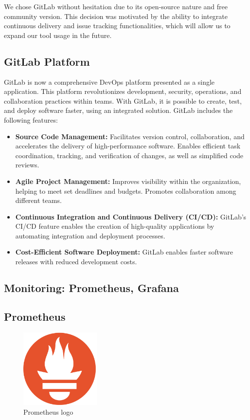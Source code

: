 We chose GitLab without hesitation due to its open-source nature and free community version. This decision was motivated by the ability to integrate continuous delivery and issue tracking functionalities, which will allow us to expand our tool usage in the future.

\subsection*{GitLab Platform}

GitLab is now a comprehensive DevOps platform presented as a single application. This platform revolutionizes development, security, operations, and collaboration practices within teams. With GitLab, it is possible to create, test, and deploy software faster, using an integrated solution. GitLab includes the following features:
\begin{itemize}
    \item \textbf{Source Code Management:} Facilitates version control, collaboration, and accelerates the delivery of high-performance software. Enables efficient task coordination, tracking, and verification of changes, as well as simplified code reviews.
    \item \textbf{Agile Project Management:} Improves visibility within the organization, helping to meet set deadlines and budgets. Promotes collaboration among different teams.
    \item \textbf{Continuous Integration and Continuous Delivery (CI/CD):} GitLab's CI/CD feature enables the creation of high-quality applications by automating integration and deployment processes.
    \item \textbf{Cost-Efficient Software Deployment:} GitLab enables faster software releases with reduced development costs.
\end{itemize}

\subsection{Monitoring: Prometheus, Grafana}
\subsection*{Prometheus}
\begin{figure}[H]
  \centering
  \includegraphics[width=4cm]{Logos/prometheus-logo.png}
  \caption[]{Prometheus logo}
  \label{fig:prometheus_logo}
\end{figure}

